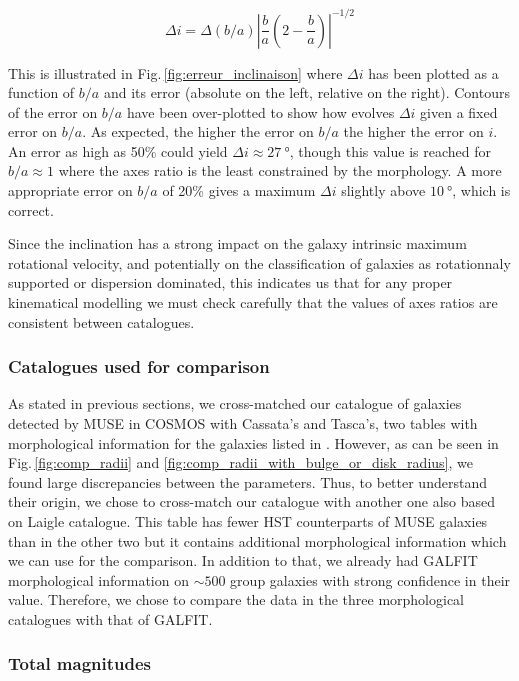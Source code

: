 \begin{equation}
	\Delta i = \Delta (b/a) \left | \frac{b}{a} \left ( 2 - \frac{b}{a} \right ) \right | ^{-1/2}
\end{equation}

This is illustrated in Fig.\,\ref{fig:erreur_inclinaison} where $\Delta i$ has been plotted as a function of $b/a$ and its error (absolute on the left, relative on the right). Contours of the error on $b/a$ have been over-plotted to show how evolves $\Delta i$ given a fixed error on $b/a$. As expected, the higher the error on $b/a$ the higher the error on $i$. An error as high as 50\% could yield $\Delta i \approx \SI{27}{\degree}$, though this value is reached for $b/a \approx 1$ where the axes ratio is the least constrained by the morphology. A more appropriate error on $b/a$ of 20\% gives a maximum $\Delta i$ slightly above $\SI{10}{\degree}$, which is correct. 

Since the inclination has a strong impact on the galaxy intrinsic maximum rotational velocity, and potentially on the classification of galaxies as rotationnaly supported or dispersion dominated, this indicates us that for any proper kinematical modelling we must check carefully that the values of axes ratios are consistent between catalogues.

\subsubsection{Catalogues used for comparison}

As stated in previous sections, we cross-matched our catalogue of galaxies detected by MUSE in COSMOS with Cassata's and Tasca's, two tables with morphological information for the galaxies listed in . However, as can be seen in Fig.\,\ref{fig:comp_radii} and \ref{fig:comp_radii_with_bulge_or_disk_radius}, we found large discrepancies between the parameters. Thus, to better understand their origin, we chose to cross-match our catalogue with another one also based on Laigle catalogue. This table has fewer HST counterparts of MUSE galaxies than in the other two but it contains additional morphological information which we can use for the comparison. In addition to that, we already had GALFIT morphological information on $\sim 500$ group galaxies with strong confidence in their value. Therefore, we chose to compare the data in the three morphological catalogues with that of GALFIT.

\subsubsection{Total magnitudes}

